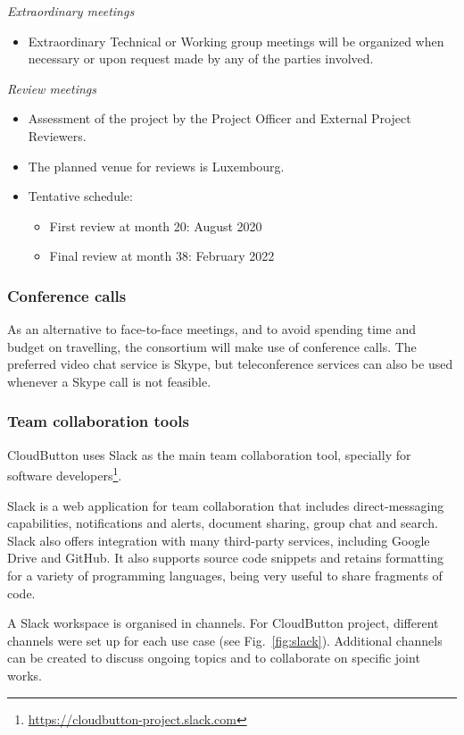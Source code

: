 \documentclass[a4paper,11pt]{article}
\begin{document}
\emph{Extraordinary meetings}
\begin{itemize}
\item Extraordinary Technical or Working group meetings will be organized when necessary or upon request made by any of the parties involved.
\end{itemize}

\emph{Review meetings}

\begin{itemize}
\item Assessment of the project by the Project Officer and External Project Reviewers.
\item The planned venue for reviews is Luxembourg.
\item Tentative schedule:
\begin{itemize}
      \item{First review at month 20: August 2020}
      \item{Final review at month 38: February 2022}
\end{itemize}
\end{itemize}


\subsubsection{Conference calls}

As an alternative to face-to-face meetings, and to avoid spending time and budget on travelling, the consortium will make use of conference calls. The preferred video chat service is Skype, but teleconference services can also be used whenever a Skype call is not feasible.

\subsubsection{Team collaboration tools}

CloudButton uses Slack as the main team collaboration tool, specially for software developers\footnote{\url{https://cloudbutton-project.slack.com}}.

Slack is a web application for team collaboration that includes direct-messaging capabilities, notifications and alerts, document sharing, group chat and search. Slack also offers integration with many third-party services, including Google Drive and GitHub. It also supports source code snippets and retains formatting for a variety of programming languages, being very useful to share fragments of code.

A Slack workspace is organised in channels. For CloudButton project, different channels were set up for each use case (see Fig.~\ref{fig:slack}). Additional channels can be created to discuss ongoing topics and to collaborate on specific joint works.
\end{document}
